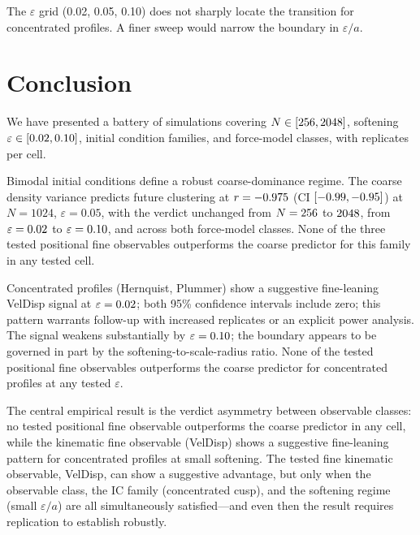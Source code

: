 \documentclass[11pt,a4paper]{article}
\newcommand{\heps}{\varepsilon}
\begin{document}
The $\heps$ grid (0.02, 0.05, 0.10) does not sharply locate the
transition for concentrated profiles.
A finer sweep would narrow the boundary in $\heps/a$.


\section{Conclusion}
\label{sec:conclusion}

We have presented a battery of \TotalRuns{} simulations covering
$N \in [256{}, 2048{}]$, softening
$\heps \in [\EpsMin{}, \EpsMax{}]$, \NICs{} initial condition families,
and \NModels{} force-model classes, with \NReplicates{} replicates per cell.

Bimodal initial conditions define a robust coarse-dominance regime.
The coarse density variance predicts future clustering at
$r = -0.975{}$ (CI $[-0.99{}, -0.95{}]$)
at $N = 1024$, $\heps = 0.05$, with the verdict unchanged from
$N = 256{}$ to $2048{}$, from $\heps = \EpsMin{}$ to
$\heps = \EpsMax{}$, and across both force-model classes.
None of the three tested positional fine observables outperforms the
coarse predictor for this family in any tested cell.

Concentrated profiles (Hernquist, Plummer) show a suggestive fine-leaning VelDisp
signal at $\heps = \EpsMin{}$; both 95\% confidence intervals include
zero; this pattern warrants follow-up with increased replicates or an
explicit power analysis.
The signal weakens substantially by $\heps = \EpsMax{}$; the boundary
appears to be governed in part by the softening-to-scale-radius ratio.
None of the tested positional fine observables outperforms the coarse
predictor for concentrated profiles at any tested $\heps$.

The central empirical result is the verdict asymmetry between observable
classes: no tested positional fine observable outperforms the coarse
predictor in any cell, while the kinematic fine observable (VelDisp) shows
a suggestive fine-leaning pattern for concentrated profiles at small
softening.
The tested fine kinematic observable, VelDisp, can show a suggestive
advantage, but only when the observable class, the IC family (concentrated
cusp), and the softening regime (small $\heps/a$) are all simultaneously
satisfied---and even then the result requires replication to establish
robustly.

\clearpage
\end{document}
